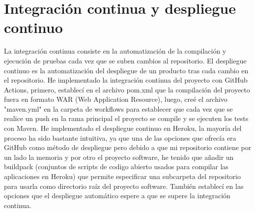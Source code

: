 \section{Integración continua y despliegue continuo}
La integración continua consiste en la automatización de la compilación y ejecución de pruebas cada vez que se suben cambios al repositorio.
El despliegue continuo es la automatización del despliegue de un producto tras cada cambio en el repositorio.
He implementado la integración continua del proyecto con GitHub Actions, primero, establecí en el archivo pom.xml que la compilación del proyecto fuera en formato WAR (Web Application Resource), luego, creé el archivo "maven.yml" en la carpeta de workflows para establecer que cada vez que se realice un push en la rama principal el proyecto se compile y se ejecuten los tests con Maven.
He implementado el despliegue continuo en Heroku, la mayoría del proceso ha sido bastante intuitiva, ya que una de las opciones que ofrecía era GitHub como método de despliegue pero debido a que mi repositorio contiene por un lado la memoria y por otro el proyecto software, he tenido que añadir un buildpack (conjuntos de scripts de codigo abierto usados para compilar las aplicaciones en Heroku) que permite especificar una subcarpeta del repositorio para usarla como directorio raíz del proyecto software. También establecí en las opciones que el despliegue automático espere a que se supere la integración continua.


